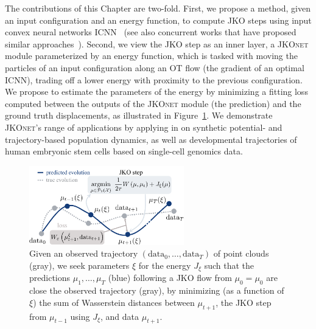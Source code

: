 The contributions of this Chapter are two-fold. First, we propose a method, given an input configuration and an energy function, to compute \acrshort{JKO} steps using input convex neural networks \acrlong{ICNN}~\citep{amos2017input,makkuva2020optimal} (see also concurrent works that have proposed similar approaches~\citep{alvarez2021optimizing, mokrov2021large}). Second, we view the \acrshort{JKO} step as an inner layer, a \textsc{JKOnet} module parameterized by an energy function, which is tasked with moving the particles of an input configuration along an OT flow (the gradient of an optimal ICNN), trading off a lower energy with proximity to the previous configuration.
We propose to estimate the parameters of the energy by minimizing a fitting loss %
computed between the outputs of the \textsc{JKOnet} module (the prediction) and the ground truth displacements, as illustrated in Figure~\ref{fig:overview_jkonet}.
We demonstrate \textsc{JKOnet}'s range of applications by applying in on synthetic potential- and trajectory-based population dynamics, as well as developmental trajectories of human embryonic stem cells based on single-cell genomics data.

\begin{figure}[t]
    \centering
    \includegraphics[width=0.6\textwidth]{figures/fig_overview_jkonet.pdf}
    \caption{Given an observed trajectory $(\mathrm{data}_0,\dots,\mathrm{data}_T)$ of point clouds (gray), we seek parameters $\xi$ for the energy $J_\xi$ such that the predictions $\mu_1, \dots, \mu_T$ (blue) following a \acrshort{JKO} flow from $\mu_0=\mu_0$ are close the observed trajectory (gray), by minimizing (as a function of $\xi$) the sum of Wasserstein distances between $\mu_{t+1}$, the \acrshort{JKO} step from $\mu_{t-1}$ using $J_\xi$, and data $\mu_{t+1}$.}
    \label{fig:overview_jkonet}
\end{figure}


